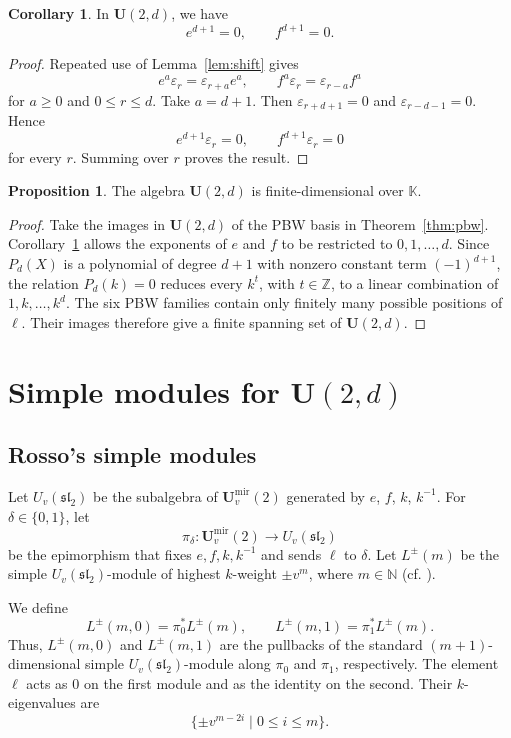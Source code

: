 \documentclass[12pt]{amsart}
\numberwithin{equation}{section}
\theoremstyle{definition}
\newtheorem{proposition}[theorem]{Proposition}
\newtheorem{corollary}[theorem]{Corollary}
\theoremstyle{definition}
\newcommand{\kk}{\mathbb K}
\newcommand{\Umir}{\mathbf U^{\mathrm{mir}}_v(2)}
\newcommand{\Ufd}{\mathbf U(2,d)}
\newcommand{\eps}{\varepsilon}
\begin{document}
\begin{corollary}\label{cor:nil}
In $\Ufd$, we have
$$
e^{d+1}=0,
\qquad
f^{d+1}=0.
$$
\end{corollary}
\begin{proof}
Repeated use of Lemma~\ref{lem:shift} gives
$$
e^a\eps_r=\eps_{r+a}e^a,
\qquad
f^a\eps_r=\eps_{r-a}f^a
$$
for $a\ge0$ and $0\le r\le d$. Take $a=d+1$. Then $\eps_{r+d+1}=0$ and $\eps_{r-d-1}=0$. Hence
$$
e^{d+1}\eps_r=0,
\qquad
f^{d+1}\eps_r=0
$$
for every $r$. Summing over $r$ proves the result.
\end{proof}

\begin{proposition}\label{prop:finite}
The algebra $\Ufd$ is finite-dimensional over $\kk$.
\end{proposition}
\begin{proof}
Take the images in $\Ufd$ of the PBW basis in Theorem~\ref{thm:pbw}. Corollary~\ref{cor:nil} allows the exponents of $e$ and $f$ to be restricted to $0,1,\ldots,d$. 
Since $P_d(X)$ is a polynomial of degree $d+1$ with nonzero constant term $(-1)^{d+1}$, 
the relation $P_d(k)=0$ reduces every $k^t$, with $t\in\mathbb Z$, to a linear combination of $1,k,\ldots,k^d$. 
The six PBW families contain only finitely many possible positions of $\ell$. 
Their images therefore give a finite spanning set of $\Ufd$.
\end{proof}

\section{Simple modules for \texorpdfstring{$\mathbf U(2,d)$}{U(2,d)}}\label{sec:simple}
\subsection{Rosso's simple modules}\label{subsec:rossomod}

Let $U_v(\mathfrak{sl}_2)$ be the subalgebra of $\Umir$ generated by $e$, $f$, $k$, $k^{-1}$. For $\delta\in\{0,1\}$, let
$$
\pi_\delta:\Umir\longrightarrow U_v(\mathfrak{sl}_2)
$$
be the epimorphism that fixes $e,f,k,k^{-1}$ and sends $\ell$ to $\delta$. Let $L^{\pm}(m)$ be the simple $U_v(\mathfrak{sl}_2)$-module of highest $k$-weight $\pm v^m$, where $m\in\mathbb N$ (cf. \cite{Jan96}).

We define
$$
L^{\pm}(m,0)=\pi_0^*L^{\pm}(m),
\qquad
L^{\pm}(m,1)=\pi_1^*L^{\pm}(m).
$$
Thus, $L^{\pm}(m,0)$ and $L^{\pm}(m,1)$ are the pullbacks of the standard $(m+1)$-dimensional simple $U_v(\mathfrak{sl}_2)$-module along $\pi_0$ and $\pi_1$, respectively. 
The element $\ell$ acts as $0$ on the first module and as the identity on the second.
Their $k$-eigenvalues are
$$
\{\pm v^{m-2i}\mid0\le i\le m\}.
$$
\end{document}
